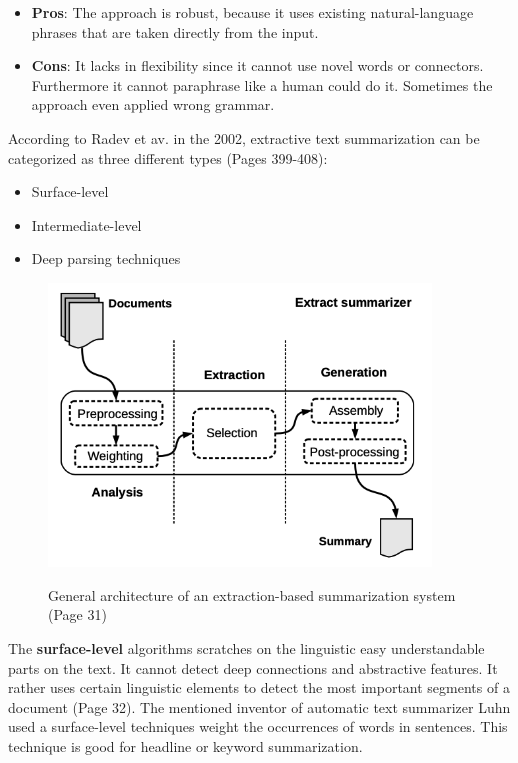 \begin{itemize}
	\item \textbf{Pros}: The approach is robust, because it uses existing natural-language phrases that are taken directly from the input.
	\item \textbf{Cons}: It lacks in flexibility since it cannot use novel words or connectors. Furthermore it cannot paraphrase like a human could do it. Sometimes the approach even applied wrong grammar.
\end{itemize}

According to Radev et av. in the 2002, extractive text summarization can be categorized as three different types \cite{ts-intro} (Pages 399-408):

\begin{itemize}
	\item Surface-level
	\item Intermediate-level
	\item Deep parsing techniques
\end{itemize}

\begin{figure}
	\begin{center}
		\includegraphics[width=4in]{photos/extract}\\
		\caption{General architecture of an extraction-based summarization system \cite{juan} (Page 31)}\label{extract}
	\end{center}
\end{figure}


The \textbf{surface-level} algorithms scratches on the linguistic easy understandable parts on the text. It cannot detect deep connections and abstractive features. It rather uses certain linguistic elements to detect the most important segments of a document \cite{juan} (Page 32). The mentioned inventor of automatic text summarizer Luhn \cite{textmining1958} used a surface-level techniques weight the occurrences of words in sentences. This technique is good for headline or keyword summarization. 

